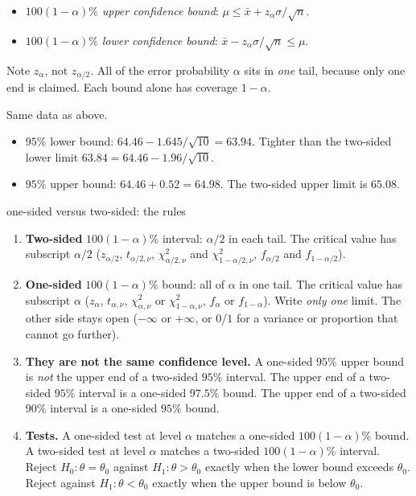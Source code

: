 \begin{definition}
\begin{itemize}
  \item $100(1-\alpha)\%$ \emph{upper confidence bound}: $\mu\le\bar{x}+z_\alpha\sigma/\sqrt n$.
  \item $100(1-\alpha)\%$ \emph{lower confidence bound}: $\bar{x}-z_\alpha\sigma/\sqrt n\le\mu$.
\end{itemize}
Note $z_\alpha$, not $z_{\alpha/2}$. All of the error probability $\alpha$ sits in \emph{one} tail, because only one end is claimed. Each bound alone has coverage $1-\alpha$.
\end{definition}

\begin{example}
Same data as above.
\begin{itemize}
  \item $95\%$ lower bound: $64.46-1.645/\sqrt{10}=63.94$. Tighter than the two-sided lower limit $63.84=64.46-1.96/\sqrt{10}$.
  \item $95\%$ upper bound: $64.46+0.52=64.98$. The two-sided upper limit is $65.08$.
\end{itemize}
\end{example}

\begin{nuance}{one-sided versus two-sided: the rules}
\begin{enumerate}
  \item \textbf{Two-sided} $100(1-\alpha)\%$ interval: $\alpha/2$ in each tail. The critical value has subscript $\alpha/2$ ($z_{\alpha/2}$, $t_{\alpha/2,\nu}$, $\chi^2_{\alpha/2,\nu}$ and $\chi^2_{1-\alpha/2,\nu}$, $f_{\alpha/2}$ and $f_{1-\alpha/2}$).
  \item \textbf{One-sided} $100(1-\alpha)\%$ bound: all of $\alpha$ in one tail. The critical value has subscript $\alpha$ ($z_\alpha$, $t_{\alpha,\nu}$, $\chi^2_{\alpha,\nu}$ or $\chi^2_{1-\alpha,\nu}$, $f_\alpha$ or $f_{1-\alpha}$). Write \emph{only one} limit. The other side stays open ($-\infty$ or $+\infty$, or $0$/$1$ for a variance or proportion that cannot go further).
  \item \textbf{They are not the same confidence level.} A one-sided $95\%$ upper bound is \emph{not} the upper end of a two-sided $95\%$ interval. The upper end of a two-sided $95\%$ interval is a one-sided $97.5\%$ bound. The upper end of a two-sided $90\%$ interval is a one-sided $95\%$ bound.
  \item \textbf{Tests.} A one-sided test at level $\alpha$ matches a one-sided $100(1-\alpha)\%$ bound. A two-sided test at level $\alpha$ matches a two-sided $100(1-\alpha)\%$ interval. Reject $H_0:\theta=\theta_0$ against $H_1:\theta>\theta_0$ exactly when the lower bound exceeds $\theta_0$. Reject against $H_1:\theta<\theta_0$ exactly when the upper bound is below $\theta_0$.
\end{enumerate}
\end{nuance}

